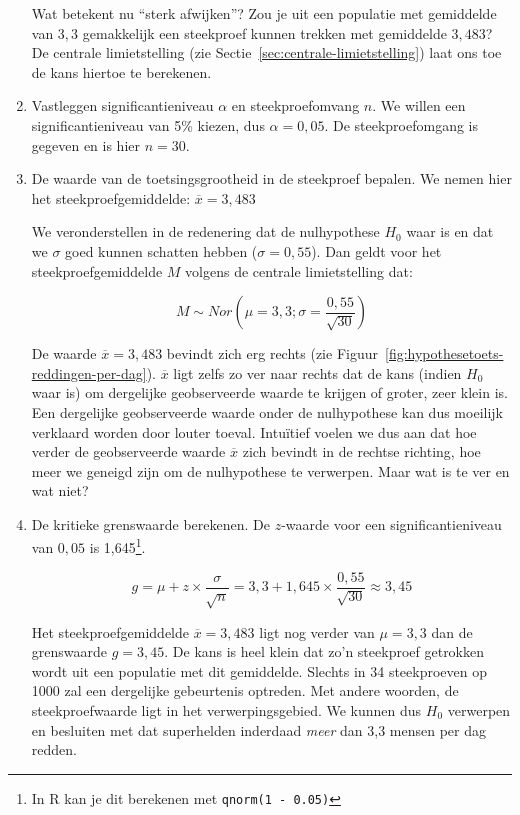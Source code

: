 \begin{example}
\begin{enumerate}
    Wat betekent nu ``sterk afwijken''? Zou je uit een populatie met gemiddelde van $3,3$ gemakkelijk een steekproef kunnen trekken met gemiddelde $3,483$? De centrale limietstelling (zie Sectie~\ref{sec:centrale-limietstelling}) laat ons toe de kans hiertoe te berekenen.
    
    \item Vastleggen significantieniveau $\alpha$ en steekproefomvang $n$. We willen een significantieniveau van 5\% kiezen, dus $\alpha = 0,05$. De steekproefomgang is gegeven en is hier $n = 30$.
    
    \item De waarde van de toetsingsgrootheid in de steekproef bepalen. We nemen hier het steekproefgemiddelde: $\overline{x} = 3,483$
    
    We veronderstellen in de redenering dat de nulhypothese $H_{0}$ waar is en dat we $\sigma$ goed kunnen schatten hebben ($\sigma = 0,55$). Dan geldt voor het steekproefgemiddelde $M$ volgens de centrale limietstelling dat:
    
    \[M \sim  Nor(\mu = 3,3; \sigma = \frac{0,55}{\sqrt{30}})\]
    
    De waarde $\overline{x} = 3,483$ bevindt zich erg rechts (zie Figuur~\ref{fig:hypothesetoets-reddingen-per-dag}). $\overline{x}$ ligt zelfs zo ver naar rechts dat de kans (indien $H_{0}$ waar is) om dergelijke geobserveerde waarde te krijgen of groter, zeer klein is. Een dergelijke geobserveerde waarde onder de nulhypothese kan dus moeilijk verklaard worden door louter toeval. Intu\"itief voelen we dus aan dat hoe verder de geobserveerde waarde $\overline{x}$ zich bevindt in de rechtse richting, hoe meer we geneigd zijn om de nulhypothese te verwerpen. Maar wat is te ver en wat niet?
    
    \item De kritieke grenswaarde berekenen. De $z$-waarde voor een significantieniveau van $0,05$ is 1,645\footnote{In R kan je dit berekenen met \texttt{qnorm(1 - 0.05)}}.
    
    \[ g = \mu + z \times \frac{\sigma}{\sqrt{n}} = 3,3 + 1,645 \times \frac{0,55}{\sqrt{30}} \approx 3,45 \]
    
    Het steekproefgemiddelde $\overline{x} = 3,483$ ligt nog verder van $\mu = 3,3$ dan de grenswaarde $g = 3,45$. De kans is heel klein dat zo'n steekproef getrokken wordt uit een populatie met dit gemiddelde. Slechts in 34 steekproeven op 1000 zal een dergelijke gebeurtenis optreden. Met andere woorden, de steekproefwaarde ligt in het verwerpingsgebied. We kunnen dus $H_0$ verwerpen en besluiten met dat superhelden inderdaad \emph{meer} dan 3,3 mensen per dag redden.
  \end{enumerate}

\end{example}

